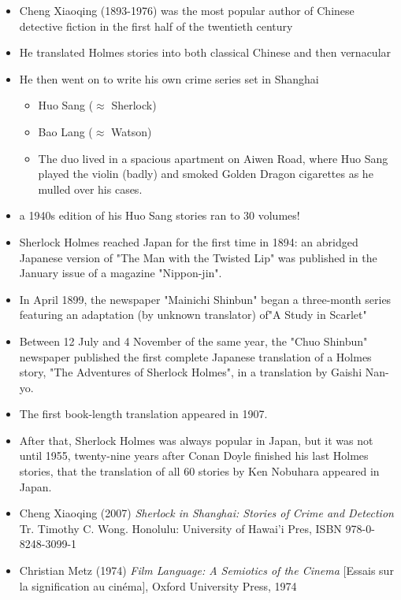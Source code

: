 \documentclass[a4paper,landscape,headrule,footrule,xetex]{foils}
\begin{document}
\begin{itemize}
\item Cheng Xiaoqing (1893-1976) was the most popular author of
  Chinese detective fiction in the first half of the twentieth century
\item He translated Holmes stories into both classical Chinese and then
  vernacular
\item  He then went on to write his own crime series set in Shanghai
  \begin{itemize}
  \item Huo Sang ($\approx$ Sherlock)
  \item Bao Lang ($\approx$ Watson)
  \item The duo lived in a spacious apartment on Aiwen Road, where Huo
    Sang played the violin (badly) and smoked Golden Dragon cigarettes
    as he mulled over his cases.
  \end{itemize}
\item a 1940s edition of his Huo Sang stories ran to 30 volumes!
\end{itemize}


\begin{itemize}
\item Sherlock Holmes reached Japan for the first time in 1894: an
  abridged Japanese version of "The Man with the Twisted Lip" was
  published in the January issue of a magazine "Nippon-jin".
\item  In April 1899, the newspaper "Mainichi Shinbun" began a
  three-month series featuring an adaptation (by unknown translator)
  of"A Study in Scarlet"
\item Between 12 July and 4 November of the same year, the "Chuo
  Shinbun" newspaper published the first complete Japanese translation
  of a Holmes story, "The Adventures of Sherlock Holmes", in a
  translation by Gaishi Nan-yo.
\item The first book-length translation appeared in 1907. 
\item After that, Sherlock Holmes was always popular in Japan, but it was not until 1955, twenty-nine years after Conan Doyle finished his last Holmes stories, that the translation of all 60 stories by Ken Nobuhara appeared in Japan.
\end{itemize}


  \begin{itemize}
  \item Cheng Xiaoqing (2007) \textit{Sherlock in Shanghai: Stories of
      Crime and Detection} Tr. Timothy C. Wong. Honolulu: University
    of Hawai’i Pres,  ISBN 978-0-8248-3099-1 
  \item  Christian Metz (1974) \textit{Film Language: A Semiotics of
      the Cinema} [Essais sur la signification au cinéma], Oxford
    University Press, 1974
  \end{itemize}
\end{document}
